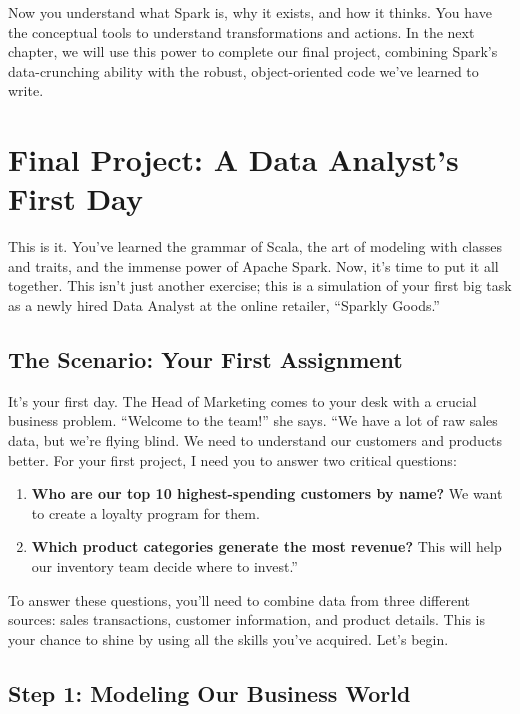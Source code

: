 \documentclass[
  letterpaper,
  DIV=11,
  numbers=noendperiod]{scrreprt}
\providecommand{\tightlist}{%
  \setlength{\itemsep}{0pt}\setlength{\parskip}{0pt}}
\begin{document}
Now you understand what Spark is, why it exists, and how it thinks. You
have the conceptual tools to understand transformations and actions. In
the next chapter, we will use this power to complete our final project,
combining Spark's data-crunching ability with the robust,
object-oriented code we've learned to write.


\chapter{Final Project: A Data Analyst's First
Day}\label{final-project-a-data-analysts-first-day}

This is it. You've learned the grammar of Scala, the art of modeling
with classes and traits, and the immense power of Apache Spark. Now,
it's time to put it all together. This isn't just another exercise; this
is a simulation of your first big task as a newly hired Data Analyst at
the online retailer, ``Sparkly Goods.''

\section{The Scenario: Your First
Assignment}\label{the-scenario-your-first-assignment}

It's your first day. The Head of Marketing comes to your desk with a
crucial business problem. ``Welcome to the team!'' she says. ``We have a
lot of raw sales data, but we're flying blind. We need to understand our
customers and products better. For your first project, I need you to
answer two critical questions:

\begin{enumerate}
\def\labelenumi{\arabic{enumi}.}
\tightlist
\item
  \textbf{Who are our top 10 highest-spending customers by name?} We
  want to create a loyalty program for them.
\item
  \textbf{Which product categories generate the most revenue?} This will
  help our inventory team decide where to invest.''
\end{enumerate}

To answer these questions, you'll need to combine data from three
different sources: sales transactions, customer information, and product
details. This is your chance to shine by using all the skills you've
acquired. Let's begin.

\section{Step 1: Modeling Our Business
World}\label{step-1-modeling-our-business-world}
\end{document}
